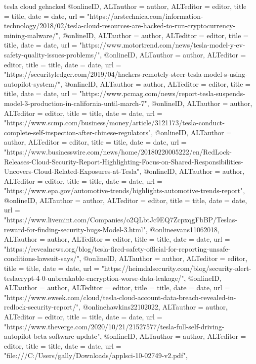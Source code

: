 {{{tesla cloud gehacked
@online{ID,	ALTauthor = {author},	ALTeditor = {editor},	title = {title},	date = {date},	url = {"https://arstechnica.com/information-technology/2018/02/tesla-cloud-resources-are-hacked-to-run-cryptocurrency-mining-malware/"},}
@online{ID,	ALTauthor = {author},	ALTeditor = {editor},	title = {title},	date = {date},	url = {"https://www.motortrend.com/news/tesla-model-y-ev-safety-quality-issues-problems/"},}
@online{ID,	ALTauthor = {author},	ALTeditor = {editor},	title = {title},	date = {date},	url = {"https://securityledger.com/2019/04/hackers-remotely-steer-tesla-model-s-using-autopilot-system/"},}
@online{ID,	ALTauthor = {author},	ALTeditor = {editor},	title = {title},	date = {date},	url = {"https://www.pcmag.com/news/report-tesla-suspends-model-3-production-in-california-until-march-7"},}
@online{ID,	ALTauthor = {author},	ALTeditor = {editor},	title = {title},	date = {date},	url = {"https://www.scmp.com/business/money/article/3121173/tesla-conduct-complete-self-inspection-after-chinese-regulators"},}
@online{ID,	ALTauthor = {author},	ALTeditor = {editor},	title = {title},	date = {date},	url = {"https://www.businesswire.com/news/home/20180220005222/en/RedLock-Releases-Cloud-Security-Report-Highlighting-Focus-on-Shared-Responsibilities-Uncovers-Cloud-Related-Exposures-at-Tesla"},}
@online{ID,	ALTauthor = {author},	ALTeditor = {editor},	title = {title},	date = {date},	url = {"https://www.epa.gov/automotive-trends/highlights-automotive-trends-report"},}
@online{ID,	ALTauthor = {author},	ALTeditor = {editor},	title = {title},	date = {date},	url = {"https://www.livemint.com/Companies/o2QLbtJc9EQ7ZcpxqgFbBP/Teslas-reward-for-finding-security-bugs-Model-3.html"},}
@online{evans11062018,	ALTauthor = {author},	ALTeditor = {editor},	title = {title},	date = {date},	url = {"https://revealnews.org/blog/tesla-fired-safety-official-for-reporting-unsafe-conditions-lawsuit-says/"},}
@online{ID,	ALTauthor = {author},	ALTeditor = {editor},	title = {title},	date = {date},	url = {"https://heimdalsecurity.com/blog/security-alert-teslacrypt-4-0-unbreakable-encryption-worse-data-leakage/"},}
@online{ID,	ALTauthor = {author},	ALTeditor = {editor},	title = {title},	date = {date},	url = {"https://www.eweek.com/cloud/tesla-cloud-account-data-breach-revealed-in-redlock-security-report/"},}
@online{hawkins22102022,	ALTauthor = {author},	ALTeditor = {editor},	title = {title},	date = {date},	url = {"https://www.theverge.com/2020/10/21/21527577/tesla-full-self-driving-autopilot-beta-software-update"},}
@online{ID,	ALTauthor = {author},	ALTeditor = {editor},	title = {title},	date = {date},	url = {"file:///C:/Users/gally/Downloads/applsci-10-02749-v2.pdf"},}
}}}
